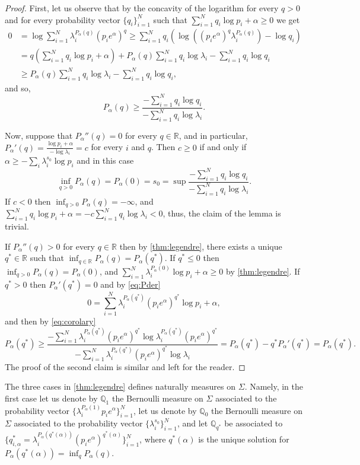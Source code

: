 \documentclass[12pt,]{article}
\theoremstyle{definition}
\theoremstyle{remark}
\renewcommand{\Bbb}[1]{\mathbb{#1}}
\newcommand{\bbQ}{{\Bbb Q}}         %
\newcommand{\bbR}{{\Bbb R}}        %
\newcommand{\0}{\mathbf{0}}
\begin{document}
\begin{proof}
  First, let us observe that by the concavity of the logarithm for every $q>0$ and for every
  probability vector $\{q_i\}_{i=1}^N$ such that $\sum_{i=1}^Nq_i\log p_i+\alpha\geq0$ we get
  \begin{align}
    0&=\log\sum_{i=1}^N\lambda_i^{P_\alpha(q)}(p_ie^{\alpha})^q\geq\sum_{i=1}^Nq_i\left(\log\left((p_ie^\alpha)^q\lambda_i^{P_\alpha(q)}\right)-\log q_i\right)\nonumber\\
     &=q\left(\sum_{i=1}^Nq_i\log p_i+\alpha\right)+P_{\alpha}(q)\sum_{i=1}^Nq_i\log\lambda_i-\sum_{i=1}^Nq_i\log q_i\nonumber\\
     &\geq P_{\alpha}(q)\sum_{i=1}^Nq_i\log\lambda_i-\sum_{i=1}^Nq_i\log q_i,\nonumber
  \end{align}
  and so,
  \begin{equation}\label{eq:corolary}
    P_\alpha(q)\geq\frac{-\sum_{i=1}^Nq_i\log q_i}{-\sum_{i=1}^Nq_i\log\lambda_i}.
  \end{equation}

  Now, suppose that $P_{\alpha}''(q)=0$ for every $q\in\bbR$, and in particular,
  $P_\alpha'(q)=\frac{\log p_i+\alpha}{-\log\lambda_i}=c$ for every $i$ and $q$. Then $c\geq0$ if
  and only if $\alpha\geq-\sum_i\lambda_i^{s_0}\log p_i$ and in this case
  $$
  \inf_{q>0}P_{\alpha}(q)=P_{\alpha}(0)=s_0=\sup\frac{-\sum_{i=1}^Nq_i\log q_i}{-\sum_{i=1}^Nq_i\log\lambda_i}.
  $$
  If $c<0$ then $\inf_{q>0}P_\alpha(q)=-\infty$, and $\sum_{i=1}^Nq_i\log
  p_i+\alpha=-c\sum_{i=1}^Nq_i\log \lambda_i<0$, thus, the claim of the lemma is trivial.

  If $P_\alpha''(q)>0$ for every $q\in\bbR$ then by \cref{thm:legendre}, there exists a unique
  $q^*\in\bbR$ such that $\inf_{q\in\bbR}P_\alpha(q)=P_\alpha(q^*)$. If $q^*\leq0$ then
  $\inf_{q>0}P_\alpha(q)=P_\alpha(0)$, and $\sum_{i=1}^N\lambda_i^{P_\alpha(0)}\log p_i+\alpha\geq0$
  by \cref{thm:legendre}. If $q^*>0$ then $P_\alpha'(q^*)=0$ and by \cref{eq:Pder}
  \[
    0=\sum_{i=1}^N\lambda_i^{P_\alpha(q^*)}(p_ie^{\alpha})^{q^*}\log p_i+\alpha,
  \]
  and then by \cref{eq:corolary}
  \[
    P_\alpha(q^*)\geq\frac{-\sum_{i=1}^N\lambda_i^{P_\alpha(q^*)}(p_ie^{\alpha})^{q^*}\log
    \lambda_i^{P_\alpha(q^*)}(p_ie^{\alpha})^{q^*}}{-\sum_{i=1}^N\lambda_i^{P_\alpha(q^*)}(p_ie^{\alpha})^{q^*}\log\lambda_i}=P_{\alpha}(q^*)-q^*P_{\alpha}'(q^*)=P_{\alpha}(q^*).
  \]
  The proof of the second claim is similar and left for the reader.
\end{proof}

The three cases in \cref{thm:legendre} defines naturally measures on $\Sigma$. Namely, in the first
case let us denote by $\bbQ_1$ the Bernoulli measure on $\Sigma$ associated to the probability vector
$\{\lambda_i^{P_\alpha(1)}p_ie^{\alpha}\}_{i=1}^N$, let us denote by $\bbQ_0$ the Bernoulli measure
on $\Sigma$ associated to the probability vector $\{\lambda_i^{s_0}\}_{i=1}^N$, and let $\bbQ_{q^*}$
be associated to
$\{q_{i,\alpha}^*=\lambda_i^{P_\alpha(q^*(\alpha))}(p_ie^{\alpha})^{q^*(\alpha)}\}_{i=1}^N$, where
$q^*(\alpha)$ is the
unique solution for $P_\alpha(q^*(\alpha))=\inf_qP_\alpha(q)$.
\end{document}
